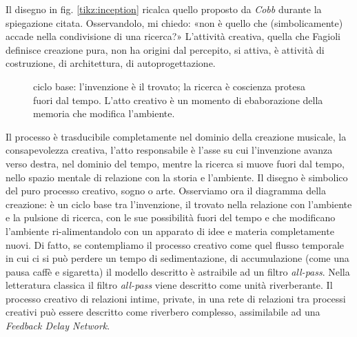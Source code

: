 Il disegno in fig. \ref{tikz:inception} ricalca quello proposto da \emph{Cobb}
durante la spiegazione citata.
Osservandolo, mi chiedo: «non è quello che (simbolicamente) accade nella
condivisione di una ricerca?» L'attività creativa, quella che Fagioli definisce
creazione pura, non ha origini dal percepito, si attiva, è attività di
costruzione, di architettura, di autoprogettazione.

\begin{figure}[ht]
  \centering
  \caption{ciclo base: l'invenzione è il trovato; la ricerca è coscienza protesa
  fuori dal tempo. L'atto creativo è un momento di ebaborazione della memoria che
  modifica l'ambiente.}
  \label{tikz:ciclobase}
\end{figure}

Il processo è trasducibile completamente nel dominio della creazione musicale,
la consapevolezza creativa, l'atto responsabile è l'asse su cui l'invenzione
avanza verso destra, nel dominio del tempo, mentre la ricerca si muove fuori
dal tempo, nello spazio mentale di relazione con la storia e l'ambiente.
Il disegno è simbolico del puro processo creativo, sogno o arte.
%
%
Osserviamo ora il diagramma della creazione: è un ciclo base tra l'invenzione,
il trovato nella relazione con l'ambiente e la pulsione di ricerca, con le sue
possibilità fuori del tempo e che modificano l'ambiente ri-alimentandolo con un
apparato di idee e materia completamente nuovi. Di fatto, se contempliamo il
processo creativo come quel flusso temporale in cui ci si può perdere un tempo
di sedimentazione, di accumulazione (come una pausa caffè e sigaretta) il
modello descritto è astraibile ad un filtro \emph{all-pass}. Nella letteratura
classica il filtro \emph{all-pass} viene descritto come unità riverberante. Il
processo creativo di relazioni intime, private, in una rete di relazioni tra
processi creativi può essere descritto come riverbero complesso, assimilabile
ad una \emph{Feedback Delay Network}.

